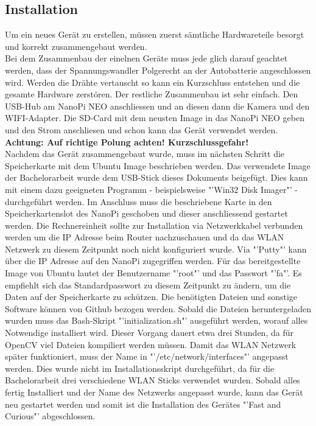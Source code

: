 \subsection{Installation}
Um ein neues Gerät zu erstellen, müssen zuerst sämtliche Hardwareteile besorgt und korrekt zusammengebaut werden.\\

Bei dem Zusammenbau der einelnen Ger\"ate muss jede glich darauf geachtet werden, dass der Spannungswandler Polgerecht an der Autobatterie angeschlossen wird. Werden die Dr\"ahte vertauscht so kann ein Kurzschluss entstehen und die gesamte Hardware zerst\"oren. Der restliche Zusammenbau ist sehr einfach. Den USB-Hub am NanoPi NEO anschliessen und an diesen dann die Kamera und den WIFI-Adapter. Die SD-Card mit dem neusten Image in das NanoPi NEO geben und den Strom anschliesen und schon kann das Ger\"at verwendet werden.\\
\textbf{Achtung: Auf richtige Polung achten! Kurzschlussgefahr!}\\


Nachdem das Gerät zusammengebaut wurde, muss im nächsten Schritt die Speicherkarte mit dem Ubuntu Image beschrieben werden. Das verwendete Image der Bachelorarbeit wurde dem USB-Stick dieses Dokuments beigefügt. Dies kann mit einem dazu geeigneten Programm - beispielsweise "'Win32 Disk Imager"' - durchgeführt werden. Im Anschluss muss die beschriebene Karte in den Speicherkartenslot des NanoPi geschoben und dieser anschliessend gestartet werden. Die Rechnereinheit sollte zur Installation via Netzwerkkabel verbunden werden um die IP Adresse beim Router nachzuschauen und da das WLAN Netzwerk zu diesem Zeitpunkt noch nicht konfiguriert wurde. Via "'Putty"' kann über die IP Adresse auf den NanoPi zugegriffen werden. Für das bereitgestellte Image von Ubuntu lautet der Benutzername "'root"' und das Passwort "'fa"'. Es empfiehlt sich das Standardpasswort zu diesem Zeitpunkt zu ändern, um die Daten auf der Speicherkarte zu schützen. Die benötigten Dateien und sonstige Software können von Github bezogen werden. Sobald die Dateien heruntergeladen wurden muss das Bash-Skript "'initialization.sh"' ausgeführt werden, worauf alles Notwendige installiert wird. Dieser Vorgang dauert etwa drei Stunden, da für OpenCV viel Dateien kompiliert werden müssen.
Damit das WLAN Netzwerk später funktioniert, muss der Name in "'/etc/network/interfaces"' angepasst werden. Dies wurde nicht im Installationsskript durchgeführt, da für die Bachelorarbeit drei verschiedene WLAN Sticks verwendet wurden. Sobald alles fertig Installiert und der Name des Netzwerks angepasst wurde, kann das Gerät neu gestartet werden und somit ist die Installation des Gerätes "'Fast and Curious"' abgeschlossen.